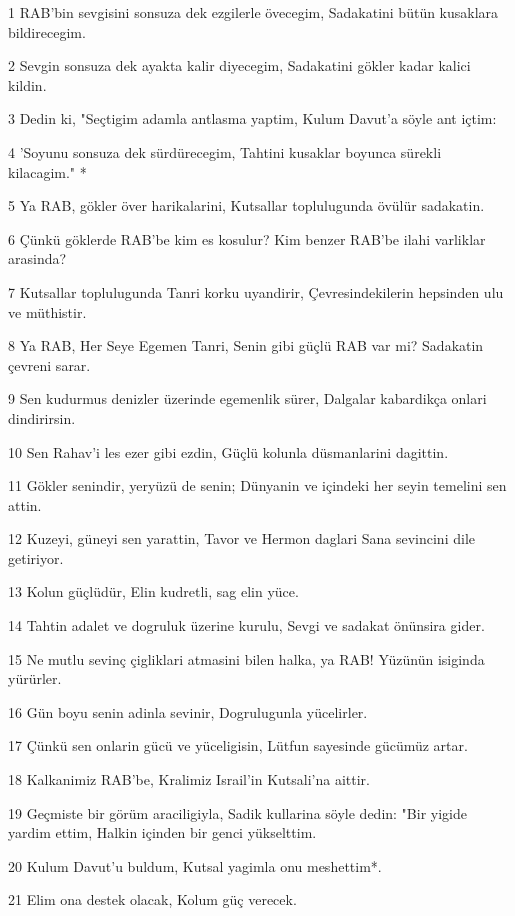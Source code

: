 \par 1 RAB'bin sevgisini sonsuza dek ezgilerle övecegim, Sadakatini bütün kusaklara bildirecegim.
\par 2 Sevgin sonsuza dek ayakta kalir diyecegim, Sadakatini gökler kadar kalici kildin.
\par 3 Dedin ki, "Seçtigim adamla antlasma yaptim, Kulum Davut'a söyle ant içtim:
\par 4 'Soyunu sonsuza dek sürdürecegim, Tahtini kusaklar boyunca sürekli kilacagim." *
\par 5 Ya RAB, gökler över harikalarini, Kutsallar toplulugunda övülür sadakatin.
\par 6 Çünkü göklerde RAB'be kim es kosulur? Kim benzer RAB'be ilahi varliklar arasinda?
\par 7 Kutsallar toplulugunda Tanri korku uyandirir, Çevresindekilerin hepsinden ulu ve müthistir.
\par 8 Ya RAB, Her Seye Egemen Tanri, Senin gibi güçlü RAB var mi? Sadakatin çevreni sarar.
\par 9 Sen kudurmus denizler üzerinde egemenlik sürer, Dalgalar kabardikça onlari dindirirsin.
\par 10 Sen Rahav'i les ezer gibi ezdin, Güçlü kolunla düsmanlarini dagittin.
\par 11 Gökler senindir, yeryüzü de senin; Dünyanin ve içindeki her seyin temelini sen attin.
\par 12 Kuzeyi, güneyi sen yarattin, Tavor ve Hermon daglari Sana sevincini dile getiriyor.
\par 13 Kolun güçlüdür, Elin kudretli, sag elin yüce.
\par 14 Tahtin adalet ve dogruluk üzerine kurulu, Sevgi ve sadakat önünsira gider.
\par 15 Ne mutlu sevinç çigliklari atmasini bilen halka, ya RAB! Yüzünün isiginda yürürler.
\par 16 Gün boyu senin adinla sevinir, Dogrulugunla yücelirler.
\par 17 Çünkü sen onlarin gücü ve yüceligisin, Lütfun sayesinde gücümüz artar.
\par 18 Kalkanimiz RAB'be, Kralimiz Israil'in Kutsali'na aittir.
\par 19 Geçmiste bir görüm araciligiyla, Sadik kullarina söyle dedin: "Bir yigide yardim ettim, Halkin içinden bir genci yükselttim.
\par 20 Kulum Davut'u buldum, Kutsal yagimla onu meshettim*.
\par 21 Elim ona destek olacak, Kolum güç verecek.
